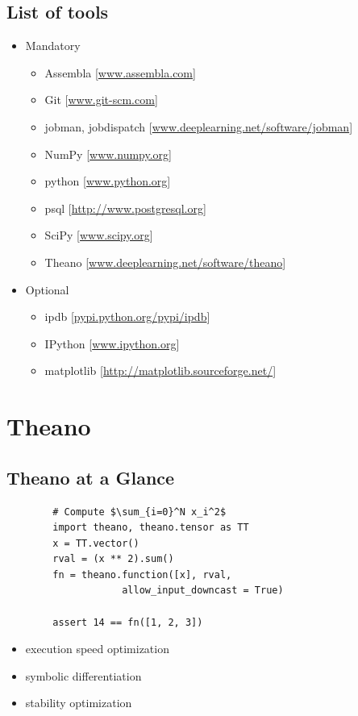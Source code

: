 \documentclass[9pt]{beamer}
\begin{document}
\subsection{List of tools}
\begin{frame}
    \begin{itemize}
        \item Mandatory
        \begin{itemize}
            \item Assembla [\url{www.assembla.com}]
            \item Git [\url{www.git-scm.com}]
            \item jobman, jobdispatch [\url{www.deeplearning.net/software/jobman}]
            \item NumPy [\url{www.numpy.org}]
            \item python [\url{www.python.org}]
            \item psql [\url{http://www.postgresql.org}]
            \item SciPy [\url{www.scipy.org}]
            \item Theano [\url{www.deeplearning.net/software/theano}]
        \end{itemize}
        \item Optional
        \begin{itemize}
            \item ipdb [\url{pypi.python.org/pypi/ipdb}]
            \item IPython [\url{www.ipython.org}]
            \item matplotlib [\url{http://matplotlib.sourceforge.net/}]
        \end{itemize}
    \end{itemize}
\end{frame}

\section{Theano}
\subsection{Theano at a Glance}

\begin{frame}[fragile]
    \begin{verbatim}
        # Compute $\sum_{i=0}^N x_i^2$
        import theano, theano.tensor as TT
        x = TT.vector()
        rval = (x ** 2).sum()
        fn = theano.function([x], rval, 
                    allow_input_downcast = True)

        assert 14 == fn([1, 2, 3])

    \end{verbatim}
    \begin{itemize}
        \item execution speed optimization
        \item symbolic differentiation
        \item stability optimization
    \end{itemize}
\end{frame}
\end{document}
